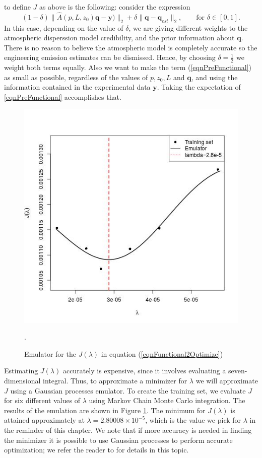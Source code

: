 \documentclass{sfuthesis}
\newcommand{\q}{\textbf{q}}
\newcommand{\pars}{p,z_{0},L}
\newcommand{\y}{\textbf{y}}
\begin{document}
to define $J$ as above is the following: consider
the expression
\begin{equation}\label{eqnPreFunctional}
(1-\delta)\|\widehat{A}(p,L,z_{0})\q-\y)\|_{2}+\delta\|\q-\q_{est}\|_{2},\qquad\text{for }\delta\in [0,1].
\end{equation}
In this case, depending on the value of $\delta$, we are giving different weights to the atmospheric 
disperssion model credibility,
and the prior information about $\q$. There is no reason to believe the atmospheric model is completely
accurate so the engineering emission estimates  can be dismissed. Hence, by choosing $\delta=\frac{1}{2}$
we weight both terms equally. Also we want to make the term (\ref{eqnPreFunctional}) as small
as possible, regardless of the values of $\pars$ and $\q$, and using the information
contained in the experimental data $\y$. Taking the expectation of \eqref{eqnPreFunctional}
accomplishes that. 

\begin{figure}
\centering
\includegraphics[scale=0.5]{./FigChap4/lambdaEmul}
\caption{Emulator for the $J(\lambda)$ in equation (\ref{eqnFunctional2Optimize})}.
\label{figLambdaEmul}
\end{figure}

Estimating $J(\lambda)$ accurately is expensive, since  it involves evaluating a seven-dimensional
integral. Thus, to approximate a minimizer for $\lambda$  we will approximate $J$ using a Gaussian processes emulator. 
To create the training set, we evaluate
$J$ for six different values of $\lambda$ using Markov Chain Monte Carlo integration.
The results of the emulation are shown in Figure \ref{figLambdaEmul}. The minimum for 
$J(\lambda)$ is attained approximately at $\lambda=2.80008\times 10^{-5}$, which is
 the value we pick for $\lambda$ in the reminder of this chapter. We note that if more
accuracy is needed in finding the minimizer it is possible to use Gaussian processes to perform
accurate  optimization; we refer the reader to \cite{osborne2009gaussian} for details in this topic.
\end{document}
